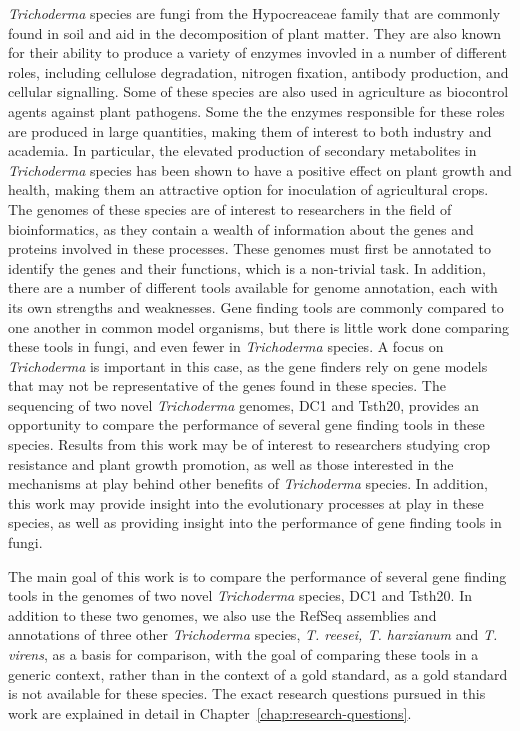 \textit{Trichoderma} species are fungi from the Hypocreaceae family
 that are commonly found in soil and aid in the decomposition of plant matter.
 They are also known for their ability to produce a variety of enzymes invovled in a number of different roles, including cellulose degradation, nitrogen fixation, antibody production, and cellular signalling. Some of these species are also used in agriculture as biocontrol agents against plant pathogens. Some the the enzymes responsible for these roles are produced in large quantities, making them of interest to both industry and academia. In particular, the elevated production of secondary metabolites in \textit{Trichoderma} species has been shown to have a positive effect on plant growth and health, making them an attractive option for inoculation of agricultural crops. The genomes of these species are of interest to researchers in the field of bioinformatics, as they contain a wealth of information about the genes and proteins involved in these processes. These genomes must first be annotated to identify the genes and their functions, which is a non-trivial task. In addition, there are a number of different tools available for genome annotation, each with its own strengths and weaknesses. Gene finding tools are commonly compared to one another in common model organisms, but there is little work done comparing these tools in fungi, and even fewer in \textit{Trichoderma} species. A focus on \textit{Trichoderma} is important in this case, as the gene finders rely on gene models that may not be representative of the genes found in these species.
  The sequencing of two novel \textit{Trichoderma} genomes, DC1 and Tsth20, provides an opportunity to compare the performance of several gene finding tools in these species. Results from this work may be of interest to researchers studying crop resistance and plant growth promotion, as well as those interested in the mechanisms at play behind other benefits of \textit{Trichoderma} species. In addition, this work may provide insight into the evolutionary processes at play in these species, as well as providing insight into the performance of gene finding tools in fungi.

 The main goal of this work is to compare the performance of several gene finding tools in the genomes of two novel \textit{Trichoderma} species, DC1 and Tsth20. In addition to these two genomes, we also use the RefSeq assemblies and annotations of three other \textit{Trichoderma} species, \textit{T. reesei, T. harzianum} and \textit{T. virens}, as a basis for comparison, with the goal of comparing these tools in a generic context, rather than in the context of a gold standard, as a gold standard is not available for these species. The exact research questions pursued in this work are explained in detail in Chapter~\ref{chap:research-questions}. 

